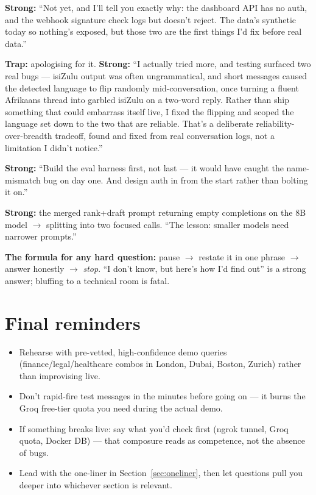 \documentclass[11pt, a4paper]{article}
\begin{document}
\begin{description}[leftmargin=0pt, style=nextline]
  \item[``Is it secure?''] \textbf{Strong:} ``Not yet, and I'll tell you exactly why: the dashboard API has no auth, and the webhook signature check logs but doesn't reject. The data's synthetic today so nothing's exposed, but those two are the first things I'd fix before real data.''
  \item[``Why only 2 of 11 languages?''] \textbf{Trap:} apologising for it. \textbf{Strong:} ``I actually tried more, and testing surfaced two real bugs --- isiZulu output was often ungrammatical, and short messages caused the detected language to flip randomly mid-conversation, once turning a fluent Afrikaans thread into garbled isiZulu on a two-word reply. Rather than ship something that could embarrass itself live, I fixed the flipping and scoped the language set down to the two that are reliable. That's a deliberate reliability-over-breadth tradeoff, found and fixed from real conversation logs, not a limitation I didn't notice.''
  \item[``What would you do differently if you started over?''] \textbf{Strong:} ``Build the eval harness first, not last --- it would have caught the name-mismatch bug on day one. And design auth in from the start rather than bolting it on.''
  \item[``What was the hardest bug?''] \textbf{Strong:} the merged rank+draft prompt returning empty completions on the 8B model $\to$ splitting into two focused calls. ``The lesson: smaller models need narrower prompts.''
\end{description}

\textbf{The formula for any hard question:} pause $\to$ restate it in one phrase $\to$ answer honestly $\to$ \emph{stop}. ``I don't know, but here's how I'd find out'' is a strong answer; bluffing to a technical room is fatal.

\section{Final reminders}
\begin{itemize}
    \item Rehearse with pre-vetted, high-confidence demo queries (finance/legal/healthcare combos in London, Dubai, Boston, Zurich) rather than improvising live.
    \item Don't rapid-fire test messages in the minutes before going on --- it burns the Groq free-tier quota you need during the actual demo.
    \item If something breaks live: say what you'd check first (ngrok tunnel, Groq quota, Docker DB) --- that composure reads as competence, not the absence of bugs.
    \item Lead with the one-liner in Section~\ref{sec:oneliner}, then let questions pull you deeper into whichever section is relevant.
\end{itemize}
\end{document}
